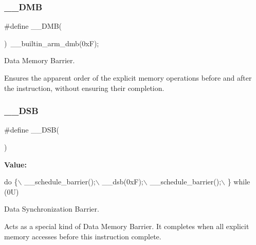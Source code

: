 \subsubsection{\texorpdfstring{\+\_\+\+\_\+\+D\+MB}{\_\_DMB}\hspace{0.1cm}{\footnotesize\ttfamily [2/2]}}
{\footnotesize\ttfamily \#define \+\_\+\+\_\+\+D\+MB(\begin{DoxyParamCaption}{ }\end{DoxyParamCaption})~\+\_\+\+\_\+builtin\+\_\+arm\+\_\+dmb(0x\+F);}



Data Memory Barrier. 

Ensures the apparent order of the explicit memory operations before and after the instruction, without ensuring their completion. \mbox{\label{group___c_m_s_i_s___core___instruction_interface_ga067d257a2b34565410acefb5afef2203}} 
\subsubsection{\texorpdfstring{\+\_\+\+\_\+\+D\+SB}{\_\_DSB}\hspace{0.1cm}{\footnotesize\ttfamily [1/2]}}
{\footnotesize\ttfamily \#define \+\_\+\+\_\+\+D\+SB(\begin{DoxyParamCaption}{ }\end{DoxyParamCaption})}

{\bfseries Value\+:}
\begin{DoxyCode}
\textcolor{keywordflow}{do} \{\(\backslash\)
                   \_\_schedule\_barrier();\(\backslash\)
                   \_\_dsb(0xF);\(\backslash\)
                   \_\_schedule\_barrier();\(\backslash\)
                \} \textcolor{keywordflow}{while} (0U)
\end{DoxyCode}


Data Synchronization Barrier. 

Acts as a special kind of Data Memory Barrier. It completes when all explicit memory accesses before this instruction complete. \mbox{\label{group___c_m_s_i_s___core___instruction_interface_ga067d257a2b34565410acefb5afef2203}} 
